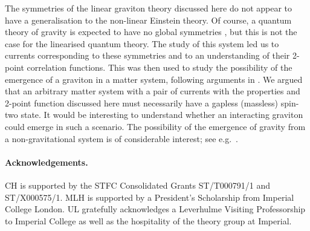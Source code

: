 The symmetries of the linear graviton theory discussed here do not appear to have a generalisation to the non-linear Einstein theory. Of course, a quantum theory of gravity is expected to have no global symmetries \cite{Banks:2010zn, Harlow:2018tng}, but this is not the case for the linearised quantum theory. The study of this system led us to currents corresponding to these symmetries and to an understanding of their 2-point correlation functions.
This was then used to study the possibility of the emergence of a graviton in a matter system, following arguments in \cite{Hinterbichler2023GravitySymmetries}.
We argued that an arbitrary matter system with a pair of currents with the properties and 2-point function discussed here must necessarily have a gapless (massless) spin-two state. 
It would be interesting to understand whether an interacting graviton could emerge in such a scenario.
The possibility of the emergence of gravity from a non-gravitational system is of considerable interest; see e.g.~\cite{Verlinde:2016toy}.


\paragraph{Acknowledgements.}
CH is supported by the STFC Consolidated Grants ST/T000791/1 and ST/X000575/1.
MLH is supported by a President's Scholarship from Imperial College London.
UL gratefully acknowledges a Leverhulme Visiting Professorship to Imperial College as well as the hospitality of the theory group at Imperial. 
